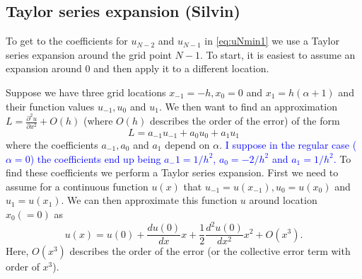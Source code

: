 \documentclass[dvipsnames]{article}
\def\SWcomment[#1]{\textcolor{blue}{#1}}
\begin{document}
\subsection{Taylor series expansion (Silvin)}
To get to the coefficients for $u_{N-2}$ and $u_{N-1}$ in \eqref{eq:uNmin1} we use a Taylor series expansion around the grid point $N-1$. To start, it is easiest to assume an expansion around 0 and then apply it to a different location. 

Suppose we have three grid locations $x_{-1} = -h, x_0 = 0$ and $x_1 = h (\alpha + 1)$ and their function values $u_{-1}, u_0$ and $u_1$. We then want to find an approximation $L = \frac{\partial^2 u}{\partial x^2} + O(h)$ (where $O(h)$ describes the order of the error) of the form
%
\begin{equation}\label{eq:formL}
    L = a_{-1}u_{-1} + a_0 u_0 + a_1 u_1
\end{equation}
%
where the coefficients $a_{-1}, a_0$ and $a_1$ depend on $\alpha$. \SWcomment[I suppose in the regular case ($\alpha = 0$) the coefficients end up being $a_{-1} = 1/h^2$, $a_0 = -2/h^2$ and $a_1 = 1/h^2$.] To find these coefficients we perform a Taylor series expansion. First we need to assume for a continuous function $u(x)$ that $u_{-1} = u(x_{-1}), u_0 = u(x_0)$ and $u_1 = u(x_1)$. We can then approximate this function $u$ around location $x_0 (=0)$ as 
\begin{equation}\label{eq:taylor}
    u(x) = u(0) + \frac{du(0)}{dx}x + \frac{1}{2}\frac{d^2u(0)}{dx^2}x^2 + O(x^3).
\end{equation}
Here, $O(x^3)$ describes the order of the error (or the collective error term with order of $x^3$).
\end{document}
